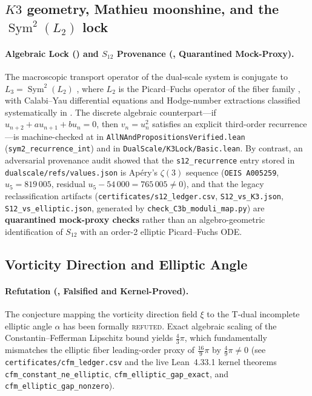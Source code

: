 \subsection{$K3$ geometry, Mathieu moonshine, and the $\operatorname{Sym}^{2}(L_{2})$ lock}
\paragraph{Algebraic Lock (\tierA{}) and $S_{12}$ Provenance (\tierX{}, Quarantined Mock-Proxy).}
The macroscopic transport operator of the dual-scale system is conjugate to
$L_{3}=\operatorname{Sym}^{2}(L_{2})$ \cite{Deligne1974}, where $L_{2}$ is the Picard--Fuchs
operator of the fiber family \cite{Doran2000, EOT2011, Gannon2016, GPPV2020}, with Calabi--Yau differential equations and Hodge-number extractions classified systematically in \cite{AlmkvistZudilin2005, DoranHarderThompson2016}. The discrete algebraic counterpart---if $u_{n+2} + a u_{n+1} + b u_n = 0$, then $v_n = u_n^2$ satisfies an explicit third-order recurrence---is machine-checked at \tierA{} in \texttt{AllNAndPropositionsVerified.lean} (\texttt{sym2\_recurrence\_int}) and in \texttt{DualScale/K3Lock/Basic.lean}. By contrast, an adversarial provenance audit showed that the \texttt{s12\_recurrence} entry stored in \texttt{dualscale/refs/values.json} is Ap\'{e}ry's $\zeta(3)$ sequence (\texttt{OEIS A005259}, $u_5 = 819\,005$, residual $u_5 - 54\,000 = 765\,005 \neq 0$), and that the legacy reclassification artifacts (\texttt{certificates/s12\_ledger.csv}, \texttt{S12\_vs\_K3.json}, \texttt{S12\_vs\_elliptic.json}, generated by \texttt{check\_C3b\_moduli\_map.py}) are \textbf{\tierX{} quarantined mock-proxy checks} rather than an algebro-geometric identification of $S_{12}$ with an order-2 elliptic Picard--Fuchs ODE.

\subsection{Vorticity Direction and Elliptic Angle}
\paragraph{Refutation (\tierX{}, Falsified and Kernel-Proved).}
The conjecture mapping the vorticity direction field $\xi$ to the T-dual incomplete elliptic angle $\alpha$ has been formally \textsc{refuted}. Exact algebraic scaling of the Constantin--Fefferman Lipschitz bound yields $\frac{4}{3}\pi$, which fundamentally mismatches the elliptic fiber leading-order proxy of $\frac{16}{9}\pi$ by $\frac{4}{9}\pi \neq 0$ (see \texttt{certificates/cfm\_ledger.csv} and the live Lean~4.33.1 kernel theorems \texttt{cfm\_constant\_ne\_elliptic}, \texttt{cfm\_elliptic\_gap\_exact}, and \texttt{cfm\_elliptic\_gap\_nonzero}).
